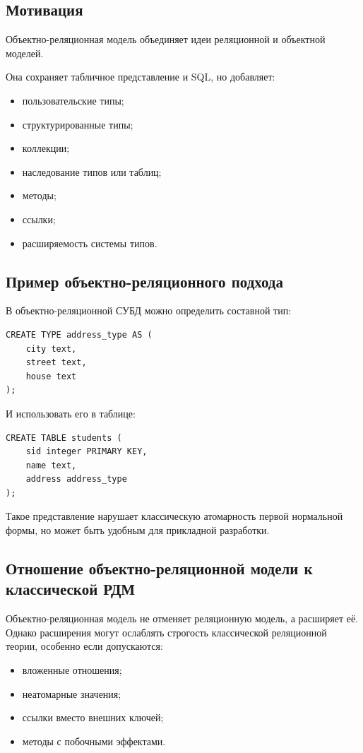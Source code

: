\documentclass[12pt,a4paper]{article}
\theoremstyle{remark}
\begin{document}
\subsection{Мотивация}

Объектно-реляционная модель объединяет идеи реляционной и объектной моделей.

Она сохраняет табличное представление и SQL, но добавляет:
\begin{itemize}
    \item пользовательские типы;
    \item структурированные типы;
    \item коллекции;
    \item наследование типов или таблиц;
    \item методы;
    \item ссылки;
    \item расширяемость системы типов.
\end{itemize}

\subsection{Пример объектно-реляционного подхода}

В объектно-реляционной СУБД можно определить составной тип:

\begin{lstlisting}[style=sqlstyle]
CREATE TYPE address_type AS (
    city text,
    street text,
    house text
);
\end{lstlisting}

И использовать его в таблице:

\begin{lstlisting}[style=sqlstyle]
CREATE TABLE students (
    sid integer PRIMARY KEY,
    name text,
    address address_type
);
\end{lstlisting}

Такое представление нарушает классическую атомарность первой нормальной формы, но может быть удобным для прикладной разработки.

\subsection{Отношение объектно-реляционной модели к классической РДМ}

Объектно-реляционная модель не отменяет реляционную модель, а расширяет её. Однако расширения могут ослаблять строгость классической реляционной теории, особенно если допускаются:
\begin{itemize}
    \item вложенные отношения;
    \item неатомарные значения;
    \item ссылки вместо внешних ключей;
    \item методы с побочными эффектами.
\end{itemize}
\end{document}
